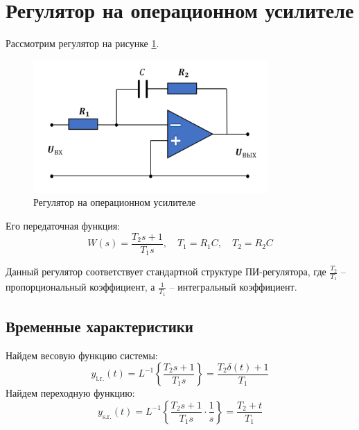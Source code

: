 \section{Регулятор на операционном усилителе}
Рассмотрим регулятор на рисунке \ref{fig:task5_reg}.
\begin{figure}[ht!]
    \centering
    \includegraphics[width=0.8\textwidth]{media/reg.png}
    \caption{Регулятор на операционном усилителе}
    \label{fig:task5_reg}
\end{figure}
Его передаточная функция:
\begin{equation}
    W(s) = \frac{T_2s + 1}{T_1s}, \quad T_1 = R_1C, \quad T_2 = R_2C
\end{equation}

Данный регулятор соответствует стандартной структуре ПИ-регулятора, где $\frac{T_2}{T_1}$ -- пропорциональный коэффициент, а $\frac{1}{T_1}$ -- интегральный коэффициент.

\subsection{Временные характеристики}
\noindent Найдем весовую функцию системы:
\begin{equation}
    y_{\text{i.r.}}(t) = L^{-1}\left\{\frac{T_2s + 1}{T_1s}\right\} = \frac{T_2\delta(t) + 1}{T_1}
\end{equation}
Найдем переходную функцию:
\begin{equation}
    y_{\text{s.r.}}(t) = L^{-1}\left\{\frac{T_2s + 1}{T_1s}\cdot\frac{1}{s}\right\} = \frac{T_2 + t}{T_1}
\end{equation}

